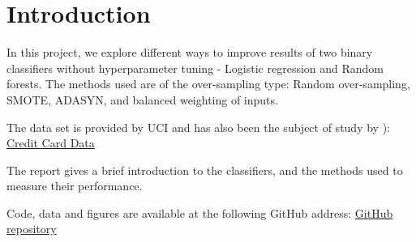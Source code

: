 \section{Introduction}
In this project, we explore different ways to improve results of two binary
classifiers without hyperparameter tuning - Logistic regression and
Random forests. The methods used are of the over-sampling type:
Random over-sampling, SMOTE, ADASYN, and balanced weighting of inputs.

The data set is provided by UCI and has also been the subject of study by \cite{ComparisonData}): 
\href{https://archive.ics.uci.edu/ml/datasets/default+of+credit+card+clients}{Credit Card Data}

The report gives a brief introduction to the classifiers, and the methods
used to measure their performance.

Code, data and figures are available at the following GitHub address:
\href{https://github.com/geirtul/fys-stk4155/tree/master/project3}{GitHub repository}


